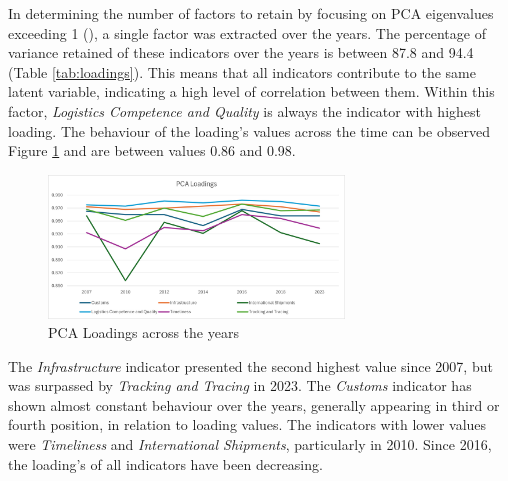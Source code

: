 \documentclass[a4paper,11pt,twoside]{article}
\begin{document}
In determining the number of factors to retain by focusing on PCA eigenvalues  exceeding 1 (\cite{carroll1978}), a single factor was extracted  over the years. The percentage of variance retained of these indicators over the years is between 87.8 and 94.4 (Table \ref{tab:loadings}). 
This means that all indicators contribute to the same latent variable, indicating a high level of correlation between them.
%
Within this factor,  \textit{Logistics Competence and Quality} is always the indicator with highest loading. The behaviour of the loading's values across the time can be observed Figure \ref{fig:PCAl} and are between values 0.86 and 0.98.
%
\begin{figure}
    \centering
    \includegraphics[width=0.7\textwidth]{Loadings.png}
    \caption{PCA Loadings across the years}
    \label{fig:PCAl}
\end{figure}
%
The \textit{Infrastructure} indicator presented the second highest value since 2007, but was surpassed by \textit{Tracking and Tracing} in 2023.
%
The \textit{Customs} indicator has shown almost constant behaviour over the years, generally appearing in third or fourth position, in relation to loading values.
%
The indicators with lower values were \textit{Timeliness} and \textit{International Shipments}, particularly in 2010.
%
Since 2016, the loading's of all indicators have been decreasing.

%
\end{document}
